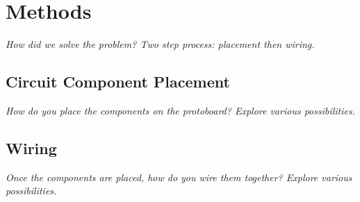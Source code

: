
\chapter{Methods}

\textit{How did we solve the problem? Two step process: placement then
wiring.}

\section{Circuit Component Placement}

\textit{How do you place the components on the protoboard? Explore various
possibilities.}

\section{Wiring}

\textit{Once the components are placed, how do you wire them together? Explore
various possibilities.}
